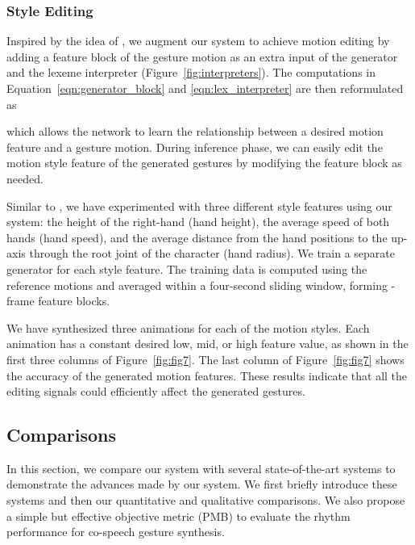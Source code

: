 \documentclass[acmtog,authorversion]{acmart}
\newcommand{\fig}{Figure{}~}
\newcommand{\eqn}{Equation{}~}
\begin{document}
\subsubsection{Style Editing}
\label{subsubsec:style_editing}
Inspired by the idea of \citet{alexanderson2020style}, we augment our system to achieve motion editing by adding a feature block  of the gesture motion as an extra input of the generator and the lexeme interpreter (\fig\ref{fig:interpreters}). The computations in \eqn\eqref{eqn:generator_block} and \eqref{eqn:lex_interpreter} are then reformulated as

which allows the network to learn the relationship between a desired motion feature and a gesture motion. During inference phase, we can easily edit the motion style feature of the generated gestures by modifying the feature block  as needed.

Similar to \cite{alexanderson2020style}, we have experimented with three different style features using our system: the height of the right-hand (hand height), the average speed of both hands (hand speed), and the average distance from the hand positions to the up-axis through the root joint of the character (hand radius). We train a separate generator for each style feature. The training data is computed using the reference motions and averaged within a four-second sliding window, forming -frame feature blocks. 

We have synthesized three animations for each of the motion styles. Each animation has a constant desired low, mid, or high feature value, as shown in the first three columns of \fig\ref{fig:fig7}. The last column of \fig\ref{fig:fig7} shows the accuracy of the generated motion features. These results indicate that all the editing signals could efficiently affect the generated gestures.

\subsection{Comparisons}
\label{sbusec:comparisons}
In this section, we compare our system with several state-of-the-art systems to demonstrate the advances made by our system. We first briefly introduce these systems and then our quantitative and qualitative comparisons. We also propose a simple but effective objective metric (PMB) to evaluate the rhythm performance for co-speech gesture synthesis.
\end{document}

